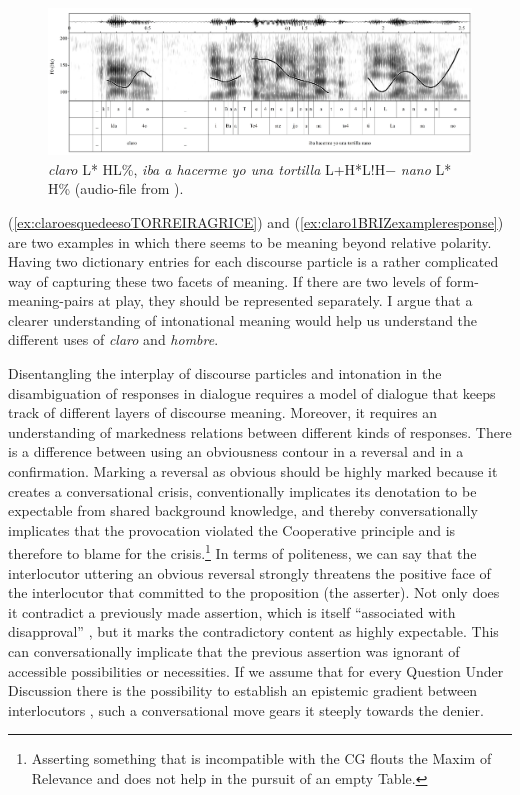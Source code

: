 \begin{figure}	
	\includegraphics[width=0.95\linewidth]{gfx/claro1_1b_short_gfx.jpg}
	\caption[\textit{Claro} L* HL\%, \textit{iba a hacerme yo una tortilla nano} L+H* LH\%]{\textit{claro} L* HL\%, \textit{iba a hacerme yo una tortilla} L+H*L!H$-$ \textit{nano} L* H\% (audio-file from \cite{PonsBorderia.2011}). \href{http://www.dpde.es/\#/entry/claro1}{\faExternalLink*}}
	\label{fig:claro1BRIZsentence}		
\end{figure}

(\ref{ex:claroesquedeesoTORREIRAGRICE}) and (\ref{ex:claro1BRIZexampleresponse}) are two examples in which there seems to be meaning beyond relative polarity. Having two dictionary entries for each discourse particle is a rather complicated way of capturing these two facets of meaning. If there are two levels of form-meaning-pairs at play, they should be represented separately. I argue that a clearer understanding of intonational meaning would help us understand the different uses of \textit{claro} and \textit{hombre}. 

\pagebreak\largerpage Disentangling the interplay of discourse particles and intonation in the disambiguation of responses in dialogue requires a model of dialogue that keeps track of different layers of discourse meaning. Moreover, it requires an understanding of markedness relations between different kinds of responses. There is a difference between using an obviousness contour in a reversal and in a confirmation. Marking a reversal as obvious should be highly marked because it creates a conversational crisis, conventionally implicates its denotation to be expectable from shared background knowledge, and thereby conversationally implicates that the provocation violated the Cooperative principle \citep{Grice.1975} and is therefore to blame for the crisis.\footnote{Asserting something that is incompatible with the \ac{CG} flouts the Maxim of Relevance and does not help in the pursuit of an empty Table.} In terms of politeness, we can say that the interlocutor uttering an obvious reversal strongly threatens the positive face of the interlocutor that committed to the proposition (the asserter). Not only does it contradict a previously made assertion, which is itself ``associated with disapproval'' \citep[66]{BrownLevinson.1988}, but it marks the contradictory content as highly expectable. This can conversationally implicate that the previous assertion was ignorant of accessible possibilities or necessities. If we assume that for every Question Under Discussion there is the possibility to establish an epistemic gradient between interlocutors \citep[32]{Heritage.2012epistemicengine}, such a conversational move gears it steeply towards the denier. 

